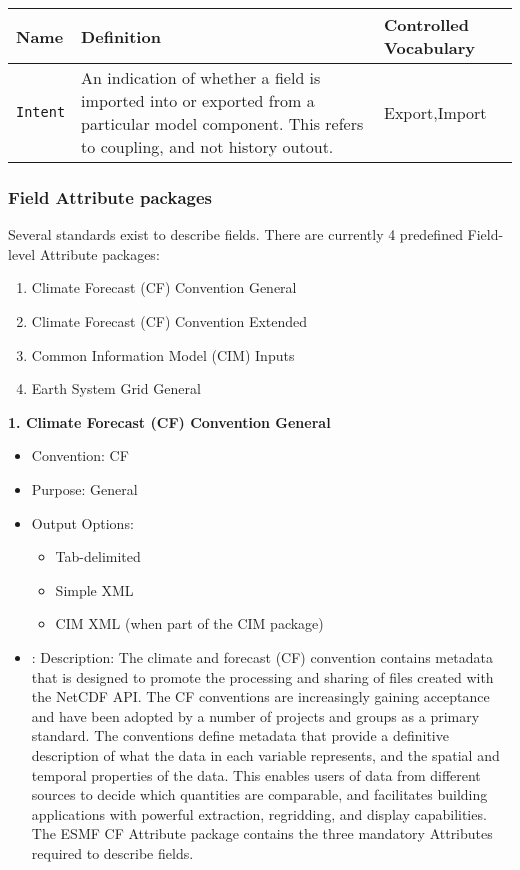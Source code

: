 \begin{tabular}{|p{8cm}|p{20cm}|p{10cm}|}
    {\bf Name } & {\bf Definition} & {\bf Controlled Vocabulary} \\
    \hline\hline
    {\tt Intent} & An indication of whether a field is imported into or exported from a particular model component. This refers to coupling, and not history outout. & Export,Import \\
\end{tabular}


\vspace{.20in}
\subsubsection{Field Attribute packages}
\label{FieldAttributePackages}

Several standards exist to describe fields. There are currently 4 predefined Field-level Attribute packages:

\begin{enumerate}
    \item Climate Forecast (CF) Convention General
    \item Climate Forecast (CF) Convention Extended
    \item Common Information Model (CIM) Inputs
    \item Earth System Grid General

\end{enumerate}

\vspace{.20in}
{\bf 1. Climate Forecast (CF) Convention General}

\begin{itemize}
    \item Convention: CF
    \item Purpose: General
    \item Output Options:
    \begin{itemize}
        \item Tab-delimited
        \item Simple XML
        \item CIM XML (when part of the CIM package)
    \end{itemize} 
    \item: Description: The climate and forecast (CF) convention contains metadata that is designed to promote the processing and sharing of files created with the NetCDF API. The CF conventions are increasingly gaining acceptance and have been adopted by a number of projects and groups as a primary standard. The conventions define metadata that provide a definitive description of what the data in each variable represents, and the spatial and temporal properties of the data. This enables users of data from different sources to decide which quantities are comparable, and facilitates building applications with powerful extraction, regridding, and display capabilities. The ESMF CF Attribute package contains the three mandatory Attributes required to describe fields.  
\end{itemize}

